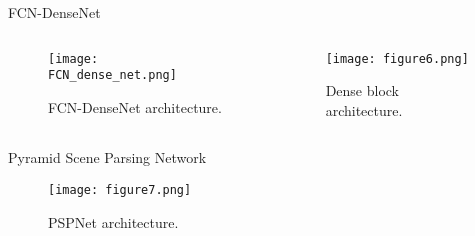 \documentclass[10pt,aspectratio=169,dvipsnames]{beamer} %
\newcounter{angle}
\begin{document}
	\begin{frame}{FCN-DenseNet}
		\begin{columns}[T]
			\begin{column}[c]{0.48\textwidth}
				\begin{figure}[h!]
					\texttt{[image: FCN\_dense\_net.png]}
					\caption{FCN-DenseNet architecture.} 
					\label{fcn}
				\end{figure}
			\end{column}
			\hfill
			\begin{column}[c]{0.48\textwidth}
				\begin{figure}[h!]
					\centering
					\texttt{[image: figure6.png]}
					\caption{Dense block architecture.} 
				\end{figure}
			\end{column}
		\end{columns}
	\end{frame}
	
	\begin{frame}{Pyramid Scene Parsing Network}
		\begin{figure} [h!]
			\centering
			\texttt{[image: figure7.png]}
			\caption{PSPNet architecture.} 
		\end{figure}
	\end{frame}
	
\end{document}
